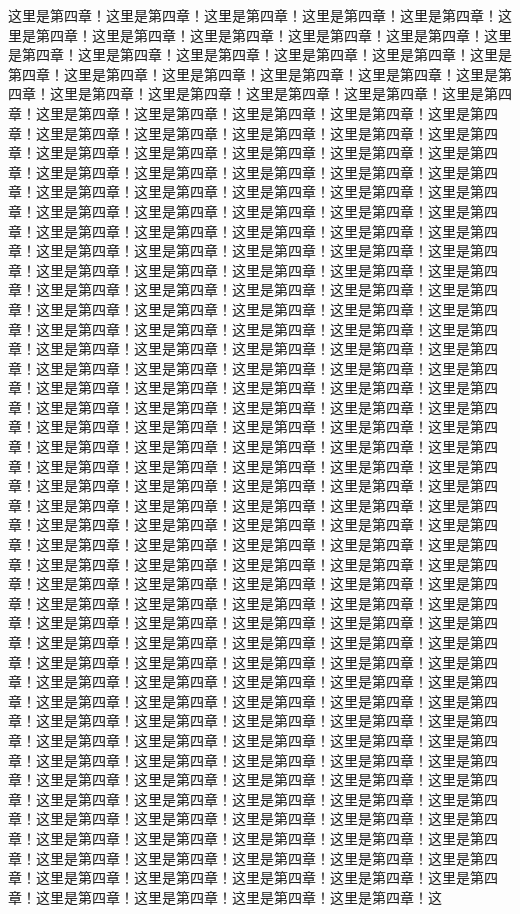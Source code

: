 
\label{sec4}
这里是第四章！这里是第四章！这里是第四章！这里是第四章！这里是第四章！这里是第四章！这里是第四章！这里是第四章！这里是第四章！这里是第四章！这里是第四章！这里是第四章！这里是第四章！这里是第四章！这里是第四章！这里是第四章！这里是第四章！这里是第四章！这里是第四章！这里是第四章！这里是第四章！这里是第四章！这里是第四章！这里是第四章！这里是第四章！这里是第四章！这里是第四章！这里是第四章！这里是第四章！这里是第四章！这里是第四章！这里是第四章！这里是第四章！这里是第四章！这里是第四章！这里是第四章！这里是第四章！这里是第四章！这里是第四章！这里是第四章！这里是第四章！这里是第四章！这里是第四章！这里是第四章！这里是第四章！这里是第四章！这里是第四章！这里是第四章！这里是第四章！这里是第四章！这里是第四章！这里是第四章！这里是第四章！这里是第四章！这里是第四章！这里是第四章！这里是第四章！这里是第四章！这里是第四章！这里是第四章！这里是第四章！这里是第四章！这里是第四章！这里是第四章！这里是第四章！这里是第四章！这里是第四章！这里是第四章！这里是第四章！这里是第四章！这里是第四章！这里是第四章！这里是第四章！这里是第四章！这里是第四章！这里是第四章！这里是第四章！这里是第四章！这里是第四章！这里是第四章！这里是第四章！这里是第四章！这里是第四章！这里是第四章！这里是第四章！这里是第四章！这里是第四章！这里是第四章！这里是第四章！这里是第四章！这里是第四章！这里是第四章！这里是第四章！这里是第四章！这里是第四章！这里是第四章！这里是第四章！这里是第四章！这里是第四章！这里是第四章！这里是第四章！这里是第四章！这里是第四章！这里是第四章！这里是第四章！这里是第四章！这里是第四章！这里是第四章！这里是第四章！这里是第四章！这里是第四章！这里是第四章！这里是第四章！这里是第四章！这里是第四章！这里是第四章！这里是第四章！这里是第四章！这里是第四章！这里是第四章！这里是第四章！这里是第四章！这里是第四章！这里是第四章！这里是第四章！这里是第四章！这里是第四章！这里是第四章！这里是第四章！这里是第四章！这里是第四章！这里是第四章！这里是第四章！这里是第四章！这里是第四章！这里是第四章！这里是第四章！这里是第四章！这里是第四章！这里是第四章！这里是第四章！这里是第四章！这里是第四章！这里是第四章！这里是第四章！这里是第四章！这里是第四章！这里是第四章！这里是第四章！这里是第四章！这里是第四章！这里是第四章！这里是第四章！这里是第四章！这里是第四章！这里是第四章！这里是第四章！这里是第四章！这里是第四章！这里是第四章！这里是第四章！这里是第四章！这里是第四章！这里是第四章！这里是第四章！这里是第四章！这里是第四章！这里是第四章！这里是第四章！这里是第四章！这里是第四章！这里是第四章！这里是第四章！这里是第四章！这里是第四章！这里是第四章！这里是第四章！这里是第四章！这里是第四章！这里是第四章！这里是第四章！这里是第四章！这里是第四章！这里是第四章！这里是第四章！这里是第四章！这里是第四章！这里是第四章！这里是第四章！这里是第四章！这里是第四章！这里是第四章！这里是第四章！这里是第四章！这里是第四章！这里是第四章！这里是第四章！这里是第四章！这里是第四章！这里是第四章！这里是第四章！这里是第四章！这里是第四章！这里是第四章！这里是第四章！这里是第四章！这里是第四章！这里是第四章！这里是第四章！这里是第四章！这里是第四章！这里是第四章！这里是第四章！这里是第四章！这里是第四章！这里是第四章！这里是第四章！这里是第四章！这里是第四章！这里是第四章！这里是第四章！这里是第四章！这里是第四章！这里是第四章！这里是第四章！这里是第四章！这里是第四章！这里是第四章！这里是第四章！这里是第四章！这
